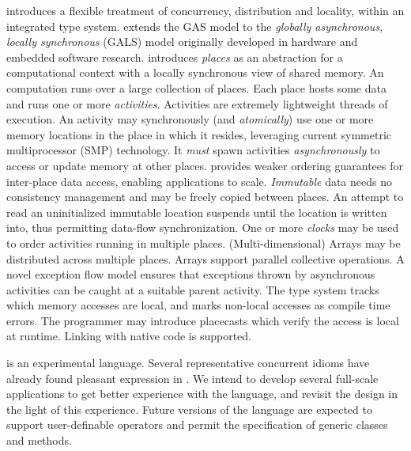 {}\Xten{} introduces a flexible treatment of concurrency, distribution
and locality, within an integrated type system. \Xten{} extends the
GAS model to the {\em globally asynchronous, locally synchronous}
(GALS) model originally developed in hardware and embedded software
research.  {}\Xten{} introduces {\em places} as an abstraction for a
computational context with a locally synchronous view of shared
memory. An \Xten{} computation runs over a large collection of places.
Each place hosts some data and runs one or more {\em
activities}. Activities are extremely lightweight threads of
execution. An activity may synchronously (and {\em atomically}) use
one or more memory locations in the place in which it resides,
leveraging current symmetric multiprocessor (SMP) technology.  It {\em
must} spawn activities {\em asynchronously} to access or update memory
at other places. \Xten{} provides weaker ordering guarantees for
inter-place data access, enabling applications to scale.  {\em
Immutable} data needs no consistency management and may be freely
copied between places.  An attempt to read an uninitialized immutable
location suspends until the location is written into, thus permitting
data-flow synchronization. One or more {\em clocks} may be used to
order activities running in multiple places. (Multi-dimensional)
Arrays may be distributed across multiple places. Arrays support
parallel collective operations. A novel exception flow model ensures
that exceptions thrown by asynchronous activities can be caught at a
suitable parent activity.  The type system tracks which memory
accesses are local, and marks non-local accesses as compile time
errors. The programmer may introduce placecasts which verify the
access is local at runtime.  Linking with native code is supported.

{}\Xten{} is an experimental language.  Several representative
concurrent idioms have already found pleasant expression in \Xten. We
intend to develop several full-scale applications to get better
experience with the language, and revisit the design in the light of
this experience. Future versions of the language are expected to
support user-definable operators and permit the specification of
generic classes and methods.


